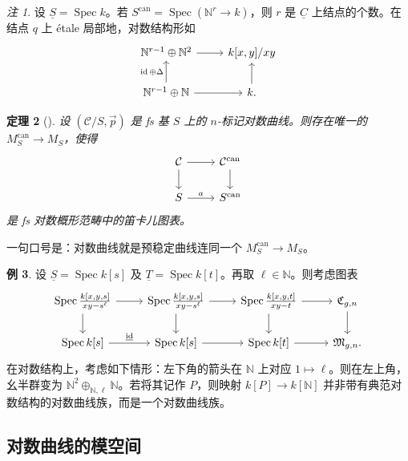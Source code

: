 \documentclass{amsart}
\newtheorem{thm}{定理}[section]
\theoremstyle{definition}
\newtheorem{exm}[thm]{例}
\theoremstyle{remark}
\newtheorem{rmk}[thm]{注}
\theoremstyle{plain}
\theoremstyle{definition}
\theoremstyle{remark}
\newcommand{\N}{\mathbb{N}}
\newcommand{\mc}[1]{\mathcal{#1}}
\newcommand{\mf}[1]{\mathfrak{#1}}
\newcommand{\on}[1]{\operatorname{#1}}
\newcommand{\ul}[1]{\underline{#1}}
\newcommand{\1}{\mathbf{1}}
\newcommand{\2}{\mathbf{2}}
\newcommand{\3}{\mathbf{3}}
\DeclareMathOperator{\Spec}{Spec}
\begin{document}
\begin{rmk}
    设 \(\ul{S} = \Spec k\)。若 \(S^{\on{can}} = \Spec (\N^r \to k)\)，则 \(r\) 是 \(\ul{C}\) 上结点的个数。在结点 \(q\) 上 \'etale 局部地，对数结构形如
    \begin{equation*}
    \begin{tikzcd}
        \N^{r-1} \oplus \N^2 \ar{r} & k[x,y]/xy \\
        \N^{r-1} \oplus \N \ar{u}{\on{id}\oplus\Delta} \ar{r} & k \ar{u}.
    \end{tikzcd}
    \end{equation*}
\end{rmk}

\begin{thm}[{\cite{FKato2000}}]
    设 \((\mc{C}/S, \vec{p})\) 是 fs 基 \(S\) 上的 \(n\)-标记对数曲线。则存在唯一的 \(M_S^{\on{can}} \to M_S\)，使得
    \begin{equation*}
    \begin{tikzcd}
        \mc{C} \ar{d} \ar{r} & \mc{C}^{\on{can}} \ar{d} \\
        S \ar{r}{a} & S^{\on{can}}
    \end{tikzcd}
    \end{equation*}
    是 fs 对数概形范畴中的笛卡儿图表。
\end{thm}

一句口号是：对数曲线就是预稳定曲线连同一个 \(M_S^{\on{can}} \to M_S\)。

\begin{exm}
    设 \(\ul{S} = \Spec k[s]\) 及 \(\ul{T} = \Spec k[t]\)。再取 \(\ell \in \N\)。则考虑图表
    \begin{equation*}
    \begin{tikzcd}
        \Spec \frac{k{ [x,y,s] }}{xy-s^{\ell}} \ar{d} \ar{r} & \Spec \frac{k{ [x,y,s] }}{xy-s^{\ell}} \ar{d} \ar{r} & \Spec  \frac{k{[x,y,t]}}{xy-t} \ar{r}\ar{d} & \mf{C}_{g,n} \ar{d} \\
        \Spec k{[s]} \ar{r}{\ul{ \on{id} }} & \Spec {k[s]} \ar{r} & \Spec k{[t]} \ar{r} & \mf{M}_{g,n}.
    \end{tikzcd}
    \end{equation*}
    在对数结构上，考虑如下情形：左下角的箭头在 \(\N\) 上对应 \(1 \mapsto \ell\)。则在左上角，幺半群变为 \(\N^2 \oplus_{\N, \ell} \N\)。若将其记作 \(P\)，则映射 \(k[P] \to k[\N]\) 并非带有典范对数结构的对数曲线族，而是一个对数曲线族。
\end{exm}

\subsection{对数曲线的模空间}%
\label{sub:Moduli of log curves}
\end{document}
